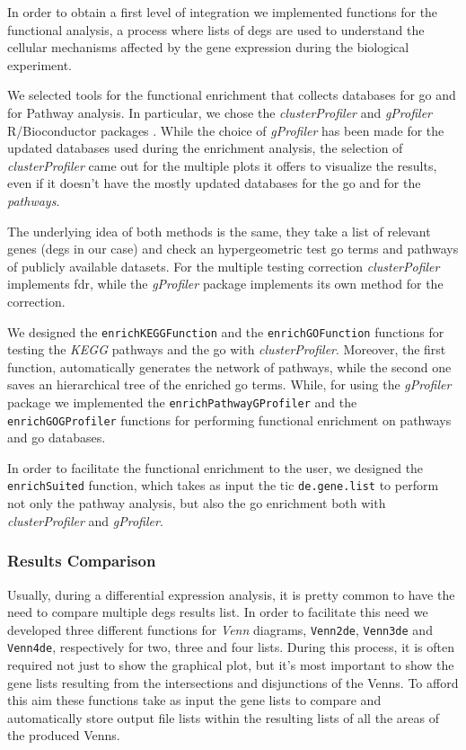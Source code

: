 In order to obtain a first level of integration we implemented functions for the functional analysis, a process where lists of \glspl{deg} are used to understand the cellular mechanisms affected by the gene expression during the biological experiment.

We selected tools for the functional enrichment that collects databases for \gls{go} and for Pathway analysis. 
In particular, we chose the \textit{clusterProfiler} and \textit{gProfiler} R/Bioconductor packages \cite{Yu2012, Reimand2016}.
While the choice of \textit{gProfiler} has been made for the updated databases used during the enrichment analysis, the selection of \textit{clusterProfiler} came out for the multiple plots it offers to visualize the results, even if it doesn't have the mostly updated databases for the \gls{go} and for the \textit{pathways}.

The underlying idea of both methods is the same, they take a list of relevant genes (\glspl{deg} in our case) and check an hypergeometric test \gls{go} terms and pathways of publicly available datasets.
For the multiple testing correction \textit{clusterPofiler} implements \gls{fdr}, while the \textit{gProfiler} package implements its own method for the correction.

We designed the \lstinline!enrichKEGGFunction! and the \lstinline!enrichGOFunction! functions for testing the \textit{KEGG} pathways and the \gls{go} with \textit{clusterProfiler}.
Moreover, the first function, automatically generates the network of pathways, while the second one saves an hierarchical tree of the enriched \gls{go} terms.
While, for using the \textit{gProfiler} package we implemented the 
\lstinline!enrichPathwayGProfiler! and the \lstinline!enrichGOGProfiler! functions for performing functional enrichment on pathways and \gls{go} databases.

In order to facilitate the functional enrichment to the user, we designed the \lstinline!enrichSuited! function, which takes as input the \gls{tic} \lstinline!de.gene.list! to perform not only the pathway analysis, but also the \gls{go} enrichment both with \textit{clusterProfiler} and \textit{gProfiler}.

\subsubsection{Results Comparison}

Usually, during a differential expression analysis, it is pretty common to have the need to compare multiple \glspl{deg} results list.
In order to facilitate this need we developed three different functions for \textit{Venn} diagrams, \lstinline!Venn2de!, \lstinline!Venn3de! and \lstinline!Venn4de!, respectively for two, three and four lists.
During this process, it is often required not just to show the graphical plot, but it's most important to show the gene lists resulting from the intersections and disjunctions of the Venns.
To afford this aim these functions take as input the gene lists to compare and automatically store output file lists within the resulting lists of all the areas of the produced Venns.

